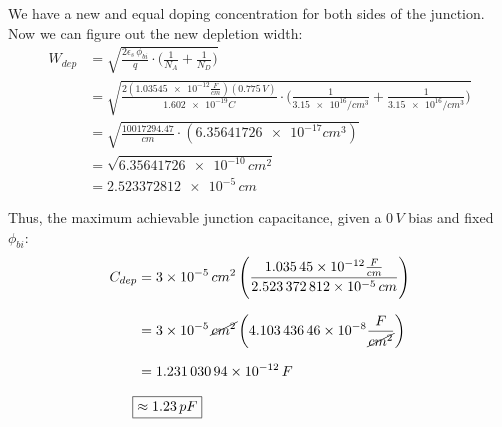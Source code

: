 \documentclass[12pt, fleqn]{article}
\begin{document}
\begin{enumerate}[label=(\alph*)]
{        \vspace{0.15cm}
        We have a new and equal doping concentration for both sides of the junction.  Now we can figure out the new depletion width:
        \begin{align*}
            W_{dep} &= \sqrt{\frac{2\epsilon_s\,\phi_{bi}}{q} \cdot \Bigg( \frac{1}{N_A} + \frac{1}{N_D} \Bigg)}\\[0.25cm]
            &= \sqrt{\frac{2(\num{1.03545e-12}\frac{F}{cm})(0.775\,V)}{\num{1.602e-19}C}
                    \cdot \Bigg( \frac{1}{\num{3.15e16}/cm^3} + \frac{1}{\num{3.15e16}/cm^3} \Bigg)}\\[0.25cm]
            &= \sqrt{\frac{10017294.47}{cm} \cdot \left(\num{6.35641726e-17}cm^3\right)}\\[0.25cm]
            &= \sqrt{\num{6.35641726e-10}\,cm^2}\\[0.25cm]
            &= \num{2.523372812e-5}\,cm
        \end{align*}        
        }
        
        Thus, the maximum achievable junction capacitance, given a $0\,V$ bias and fixed $\phi_{bi}$: 
        \begin{align*}
            C_{dep} &= \num{3e-5}\,{cm}^2 \left(\frac{\num{1.03545e-12}\frac{F}{cm}}{\num{2.523372812e-5}\,cm}\right)\\[0.25cm]
            &= \num{3e-5}\,\cancel{{cm}^2} \left(\num{4.10343646e-8}\frac{F}{\cancel{{cm}^2}}\right)\\[0.25cm]
            &= \num{1.23103094e-12}\,F\\[0.25cm]
            \Aboxed{&\approx 1.23\,pF}
        \end{align*}

\end{enumerate}
\newpage
\end{document}
